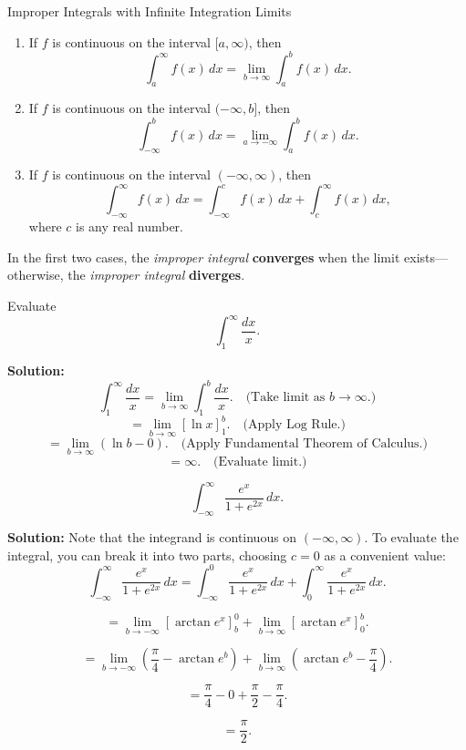 \documentclass[12pt]{article}
\theoremstyle{beautifulthm}
\begin{document}
\begin{Definition}{Improper Integrals with Infinite Integration Limits}{}
\begin{enumerate}
    \item If $f$ is continuous on the interval $[a, \infty)$, then
    \[
    \int_a^\infty f(x) \, dx = \lim_{b \to \infty} \int_a^b f(x) \, dx.
    \]

    \item If $f$ is continuous on the interval $(-\infty, b]$, then
    \[
    \int_{-\infty}^b f(x) \, dx = \lim_{a \to -\infty} \int_a^b f(x) \, dx.
    \]

    \item If $f$ is continuous on the interval $(-\infty, \infty)$, then
    \[
    \int_{-\infty}^\infty f(x) \, dx = \int_{-\infty}^c f(x) \, dx + \int_c^\infty f(x) \, dx,
    \]
    where $c$ is any real number.
\end{enumerate}

In the first two cases, the \textit{improper integral} \textbf{converges} when the limit exists—otherwise, the \textit{improper integral} \textbf{diverges}. 
\end{Definition}

\begin{tcolorbox}[colback=examplebg, colframe=red!75!black, title=\textbf{EXAMPLE 1: An Improper Integral That Diverges}, fonttitle=\bfseries, sharp corners]
Evaluate
\[
\int_1^\infty \frac{dx}{x}.
\]



\tcblower
\textbf{Solution:} 
\[
\int_1^\infty \frac{dx}{x} = \lim_{b \to \infty} \int_1^b \frac{dx}{x}. \quad \text{(Take limit as $b \to \infty$.)}
\]
\[
= \lim_{b \to \infty} \left[ \ln x \right]_1^b. \quad \text{(Apply Log Rule.)}
\]
\[
= \lim_{b \to \infty} \left( \ln b - 0 \right). \quad \text{(Apply Fundamental Theorem of Calculus.)}
\]
\[
= \infty. \quad \text{(Evaluate limit.)}
\]
\end{tcolorbox}

\begin{tcolorbox}[colback=examplebg, colframe=red!75!black, title=\textbf{EXAMPLE 2: Infinite Upper and Lower Limits of Integration}, fonttitle=\bfseries, sharp corners]
\[
\int_{-\infty}^\infty \frac{e^x}{1 + e^{2x}} \, dx.
\]


\tcblower
\textbf{Solution:} 
Note that the integrand is continuous on $(-\infty, \infty)$. To evaluate the integral, you can break it into two parts, choosing $c = 0$ as a convenient value:
\[
\int_{-\infty}^\infty \frac{e^x}{1 + e^{2x}} \, dx = \int_{-\infty}^0 \frac{e^x}{1 + e^{2x}} \, dx + \int_0^\infty \frac{e^x}{1 + e^{2x}} \, dx.
\]

\[
= \lim_{b \to -\infty} \left[ \arctan e^x \right]_b^0 + \lim_{b \to \infty} \left[ \arctan e^x \right]_0^b.
\]

\[
= \lim_{b \to -\infty} \left( \frac{\pi}{4} - \arctan e^b \right) + \lim_{b \to \infty} \left( \arctan e^b - \frac{\pi}{4} \right).
\]

\[
= \frac{\pi}{4} - 0 + \frac{\pi}{2} - \frac{\pi}{4}.
\]

\[
= \frac{\pi}{2}.
\]

\end{tcolorbox}
\end{document}
